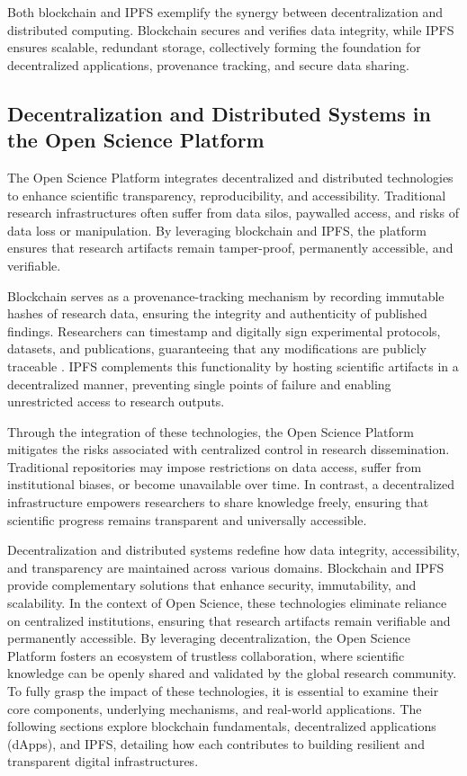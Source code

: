 \documentclass{article}
\begin{document}
Both blockchain and IPFS exemplify the synergy between decentralization and distributed computing. Blockchain secures and verifies data integrity, while IPFS ensures scalable, redundant storage, collectively forming the foundation for decentralized applications, provenance tracking, and secure data sharing.

\subsection{Decentralization and Distributed Systems in the Open Science Platform}

The Open Science Platform integrates decentralized and distributed technologies to enhance scientific transparency, reproducibility, and accessibility. Traditional research infrastructures often suffer from data silos, paywalled access, and risks of data loss or manipulation. By leveraging blockchain and IPFS, the platform ensures that research artifacts remain tamper-proof, permanently accessible, and verifiable.

Blockchain serves as a provenance-tracking mechanism by recording immutable hashes of research data, ensuring the integrity and authenticity of published findings. Researchers can timestamp and digitally sign experimental protocols, datasets, and publications, guaranteeing that any modifications are publicly traceable \cite{bonneau2015sok}. IPFS complements this functionality by hosting scientific artifacts in a decentralized manner, preventing single points of failure and enabling unrestricted access to research outputs.

Through the integration of these technologies, the Open Science Platform mitigates the risks associated with centralized control in research dissemination. Traditional repositories may impose restrictions on data access, suffer from institutional biases, or become unavailable over time. In contrast, a decentralized infrastructure empowers researchers to share knowledge freely, ensuring that scientific progress remains transparent and universally accessible.

Decentralization and distributed systems redefine how data integrity, accessibility, and transparency are maintained across various domains. Blockchain and IPFS provide complementary solutions that enhance security, immutability, and scalability. In the context of Open Science, these technologies eliminate reliance on centralized institutions, ensuring that research artifacts remain verifiable and permanently accessible. By leveraging decentralization, the Open Science Platform fosters an ecosystem of trustless collaboration, where scientific knowledge can be openly shared and validated by the global research community. To fully grasp the impact of these technologies, it is essential to examine their core components, underlying mechanisms, and real-world applications. The following sections explore blockchain fundamentals, decentralized applications (dApps), and IPFS, detailing how each contributes to building resilient and transparent digital infrastructures.
\end{document}
